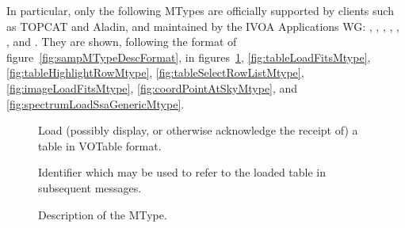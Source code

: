 		In particular, only the following MTypes are officially
		supported by clients such as TOPCAT and Aladin, and
		maintained by the IVOA Applications WG:
		, ,
		,
		,
		,
		, and
		. They are shown,
		following the format of
		figure~\ref{fig:sampMTypeDescFormat}, in
		figures~\ref{fig:tableLoadVotableMtype},
		\ref{fig:tableLoadFitsMtype},
		\ref{fig:tableHighlightRowMtype},
		\ref{fig:tableSelectRowListMtype},
		\ref{fig:imageLoadFitsMtype},
		\ref{fig:coordPointAtSkyMtype}, and
		\ref{fig:spectrumLoadSsaGenericMtype}.
		
		\begin{figure}[tbp]
			\centering
			\begin{minipage}{0.9\textwidth}
				\begin{framed}
							{
								Load (possibly display, or otherwise
								acknowledge the receipt of) a table in
								VOTable format.
							}
							{

								{
									Identifier which may be used to
									refer to the loaded table in
									subsequent messages.
								}

							}
							{\mtypeparamnone}
				\end{framed}
			\end{minipage}
			
			\caption[ MType description]
			{Description of the  MType.}
			\label{fig:tableLoadVotableMtype}
		\end{figure}
		

